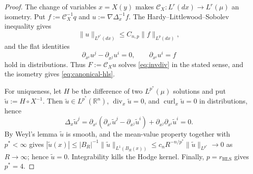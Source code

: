 \documentclass[11pt,reqno]{amsart}
\theoremstyle{plain}
\theoremstyle{definition}
\theoremstyle{remark}
\numberwithin{equation}{section}
\DeclareMathOperator{\Div}{div}
\DeclareMathOperator{\curl}{curl}
\newcommand{\Real}{\mathbb R}
\newcommand{\Rn}{\Real^n}
\begin{document}
\begin{proof}
The change of variables $x=X(y)$ makes
$\mathcal C_X:L^r(dx)\to L^r(\mu)$ an isometry.  Put
$f:=\mathcal C_X^{-1}q$ and $u:=\nabla\Delta_x^{-1}f$.  The
Hardy--Littlewood--Sobolev inequality \cite{stein} gives
\begin{equation}\label{eq:flat-hls}
 \|u\|_{L^{p^*}(dx)}\le C_{n,p}\|f\|_{L^p(dx)},
\end{equation}
and the flat identities
\[
 \partial_{x^i}u^j-\partial_{x^j}u^i=0,
 \qquad
 \partial_{x^i}u^i=f
\]
hold in distributions.  Thus $F:=\mathcal C_Xu$ solves
\eqref{eq:invdiv} in the stated sense, and the isometry gives
\eqref{eq:canonical-hls}.

For uniqueness, let $H$ be the difference of two $L^{p^*}(\mu)$ solutions
and put $\tilde u:=H\circ X^{-1}$.  Then
$\tilde u\in L^{p^*}(\Rn)$, $\Div_x\tilde u=0$, and $\curl_x\tilde u=0$ in distributions, hence
\[
 \Delta_x\tilde u^j
 =\partial_{x^i}
   (\partial_{x^i}\tilde u^j-\partial_{x^j}\tilde u^i)
  +\partial_{x^j}\partial_{x^i}\tilde u^i
 =0.
\]
By Weyl's lemma $\tilde u$ is smooth, and the mean-value property together
with $p^*<\infty$ gives
$|\tilde u(x)|\le|B_R|^{-1}\|\tilde u\|_{L^1(B_R(x))}
\le c_nR^{-n/p^*}\|\tilde u\|_{L^{p^*}}\to0$ as $R\to\infty$; hence
$\tilde u=0$. Integrability kills the Hodge kernel.
Finally,
$p=r_{\mathrm{HLS}}$ gives $p^*=4$.
\end{proof}
\end{document}
